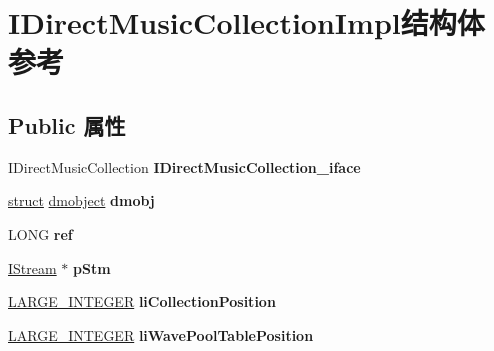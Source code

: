 \hypertarget{struct_i_direct_music_collection_impl}{}\section{I\+Direct\+Music\+Collection\+Impl结构体 参考}
\label{struct_i_direct_music_collection_impl}
\subsection*{Public 属性}
\begin{DoxyCompactItemize}
\item 
\mbox{\label{struct_i_direct_music_collection_impl_ac42c55cd489953e588e817eba41b53c9}} 
I\+Direct\+Music\+Collection {\bfseries I\+Direct\+Music\+Collection\+\_\+iface}
\item 
\mbox{\label{struct_i_direct_music_collection_impl_a4e67e4331a9dcb355bb5340f51baf7d5}} 
\hyperlink{interfacestruct}{struct} \hyperlink{structdmobject}{dmobject} {\bfseries dmobj}
\item 
\mbox{\label{struct_i_direct_music_collection_impl_affcffa6eea2eccb6ae4adc69e48eb444}} 
L\+O\+NG {\bfseries ref}
\item 
\mbox{\label{struct_i_direct_music_collection_impl_aeacefdea71f151683fbc59bb99c5832d}} 
\hyperlink{interface_i_stream}{I\+Stream} $\ast$ {\bfseries p\+Stm}
\item 
\mbox{\label{struct_i_direct_music_collection_impl_a27b9230a8b5aa0f6a88a898c194ce372}} 
\hyperlink{union___l_a_r_g_e___i_n_t_e_g_e_r}{L\+A\+R\+G\+E\+\_\+\+I\+N\+T\+E\+G\+ER} {\bfseries li\+Collection\+Position}
\item 
\mbox{\label{struct_i_direct_music_collection_impl_ab7647aa095f32f51dee5005f40e63dea}} 
\hyperlink{union___l_a_r_g_e___i_n_t_e_g_e_r}{L\+A\+R\+G\+E\+\_\+\+I\+N\+T\+E\+G\+ER} {\bfseries li\+Wave\+Pool\+Table\+Position}
\item 
\mbox{\label{struct_i_direct_music_collection_impl_ae7b6952860ccc9455a7ea15629798340}} 

\end{DoxyCompactItemize}
